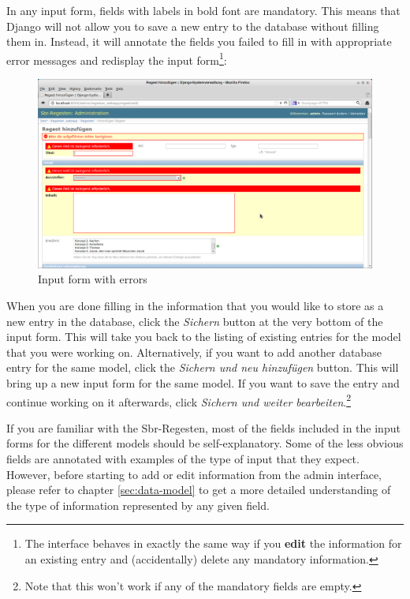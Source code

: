 In any input form, fields with labels in bold font are mandatory. This
means that Django will not allow you to save a new entry to the
database without filling them in. Instead, it will annotate the fields
you failed to fill in with appropriate error messages and redisplay
the input form\footnote{The interface behaves in exactly the same way
  if you \textbf{edit} the information for an existing entry and
  (accidentally) delete any mandatory information.}:

\begin{figure}[h]
  \centering
  \includegraphics[scale=0.3]{img/add-regest-fail}
  \caption{Input form with errors}
  \label{fig:add-regest-fail}
\end{figure}

When you are done filling in the information that you would like to
store as a new entry in the database, click the \emph{Sichern} button
at the very bottom of the input form. This will take you back to the
listing of existing entries for the model that you were working on.
Alternatively, if you want to add another database entry for the same
model, click the \emph{Sichern und neu hinzufügen} button. This will
bring up a new input form for the same model. If you want to save the
entry and continue working on it afterwards, click \emph{Sichern und
  weiter bearbeiten}.\footnote{Note that this won't work if any of the
  mandatory fields are empty.}

If you are familiar with the Sbr-Regesten, most of the fields included
in the input forms for the different models should be
self-explanatory. Some of the less obvious fields are annotated with
examples of the type of input that they expect. However, before
starting to add or edit information from the admin interface, please
refer to chapter \ref{sec:data-model} to get a more detailed
understanding of the type of information represented by any given
field.

